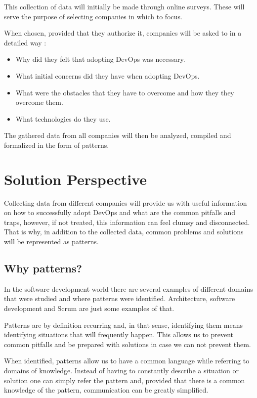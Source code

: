         This collection of data will initially be made through online surveys. These will serve the purpose of selecting companies in which to focus.
        
        When chosen, provided that they authorize it, companies will be asked to in a detailed way :
        \begin{itemize}
        	\item{ Why did they felt that adopting DevOps was necessary. }
           	\item{ What initial concerns did they have when adopting DevOps. }
			\item{ What were the obstacles that they have to overcome and how they they overcome them. }
            \item{ What technologies do they use. }
		\end{itemize}

        The gathered data from all companies will then be analyzed, compiled and formalized in the form of patterns.
        
        
        \section{Solution Perspective} \label{chap:towardsdevops:sec:solutionperspective}

		Collecting data from different companies will provide us with useful information on how to successfully adopt DevOps and what are the common pitfalls and traps, however, if not treated, this information can feel clumsy and disconnected. That is why, in addition to the collected data, common problems and solutions will be represented as patterns.  
    
    		\subsection{Why patterns?}
      		In the software development world there are several examples of different domains that were studied and where patterns were identified. Architecture, software development and Scrum are just some examples of that.
      
    		  Patterns are by definition recurring and, in that sense, identifying them means identifying situations that will frequently happen. This allows us to prevent common pitfalls and be prepared with solutions in case we can not prevent them.
    
                When identified, patterns allow us to have a common language while referring to domains of knowledge. Instead of having to constantly describe a situation or solution one can simply refer the pattern and, provided that there is a common knowledge of the pattern, communication can be greatly simplified.
    
